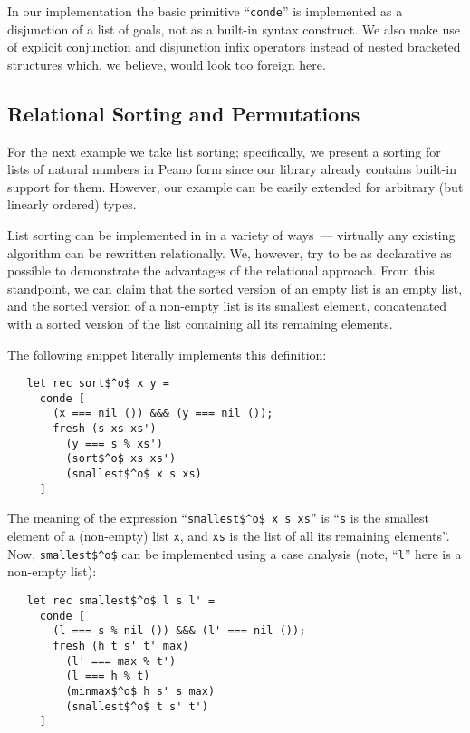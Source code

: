 In our implementation the basic \miniKanren primitive ``\lstinline|conde|'' is implemented as a
disjunction of a list of goals, not as a built-in syntax construct. We also make use of explicit
conjunction and disjunction infix operators instead of nested bracketed structures which, we
believe, would look too foreign here.

\subsection{Relational Sorting and Permutations}

For the next example we take list sorting; specifically, we present a sorting for lists of natural numbers
in Peano form since our library already contains built-in support for them. However, our example can be
easily extended for arbitrary (but linearly ordered) types.

List sorting can be implemented in \miniKanren in a variety of ways~--- virtually any existing algorithm can
be rewritten relationally. We, however, try to be as declarative as possible to demonstrate the
advantages of the relational approach. From this standpoint, we can claim that the sorted version of an empty list is an
empty list, and the sorted version of a non-empty list is its smallest element, concatenated with a sorted
version of the list containing all its remaining elements.

The following snippet literally implements this definition:

\begin{lstlisting}
   let rec sort$^o$ x y =
     conde [
       (x === nil ()) &&& (y === nil ());
       fresh (s xs xs')
         (y === s % xs')
         (sort$^o$ xs xs')
         (smallest$^o$ x s xs)
     ]
\end{lstlisting}

The meaning of the expression ``\lstinline|smallest$^o$ x s xs|'' is ``\lstinline|s| is the smallest element of a (non-empty) list \lstinline|x|, and \lstinline|xs| is the
list of all its remaining elements''. Now, \lstinline|smallest$^o$| can be implemented using a case analysis (note, ``\lstinline|l|'' here is a non-empty list):

\begin{lstlisting}
   let rec smallest$^o$ l s l' =
     conde [
       (l === s % nil ()) &&& (l' === nil ());
       fresh (h t s' t' max)
         (l' === max % t')
         (l === h % t)
         (minmax$^o$ h s' s max)
         (smallest$^o$ t s' t')
     ]
\end{lstlisting}

